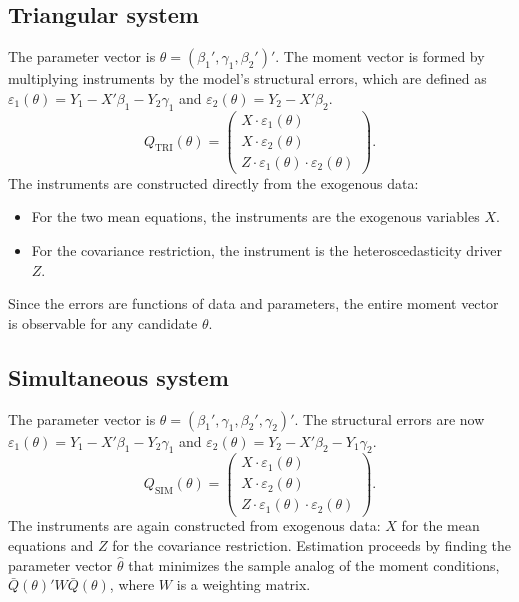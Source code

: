 \documentclass{article}
\theoremstyle{plain}
\begin{document}
\subsection{Triangular system}
The parameter vector is $\theta = (\beta_1', \gamma_1, \beta_2')'$. The moment vector is formed by multiplying instruments by the model's structural errors, which are defined as \(\varepsilon_1(\theta) = Y_1 - X'\beta_1 - Y_2\gamma_1\) and \(\varepsilon_2(\theta) = Y_2 - X'\beta_2\).
\begin{equation}\label{eq:moment_tri}
Q_{\text{TRI}}(\theta) =
  \begin{pmatrix}
    X \cdot \varepsilon_1(\theta) \\[3pt]
    X \cdot \varepsilon_2(\theta) \\[3pt]
    Z \cdot \varepsilon_1(\theta) \cdot \varepsilon_2(\theta)
  \end{pmatrix}.
\end{equation}
The instruments are constructed directly from the exogenous data:
\begin{itemize}\itemsep0pt
    \item For the two mean equations, the instruments are the exogenous variables \(X\).
    \item For the covariance restriction, the instrument is the heteroscedasticity driver \(Z\).
\end{itemize}
Since the errors are functions of data and parameters, the entire moment vector is observable for any candidate \(\theta\).

\subsection{Simultaneous system}
The parameter vector is $\theta = (\beta_1', \gamma_1, \beta_2', \gamma_2)'$. The structural errors are now \(\varepsilon_1(\theta) = Y_1 - X'\beta_1 - Y_2\gamma_1\) and \(\varepsilon_2(\theta) = Y_2 - X'\beta_2 - Y_1\gamma_2\).
\begin{equation}\label{eq:moment_sim}
Q_{\text{SIM}}(\theta) =
  \begin{pmatrix}
    X \cdot \varepsilon_1(\theta) \\[3pt]
    X \cdot \varepsilon_2(\theta) \\[3pt]
    Z \cdot \varepsilon_1(\theta) \cdot \varepsilon_2(\theta)
  \end{pmatrix}.
\end{equation}
The instruments are again constructed from exogenous data: \(X\) for the mean equations and \(Z\) for the covariance restriction. Estimation proceeds by finding the parameter vector \(\hat\theta\) that minimizes the sample analog of the moment conditions, \(\bar{Q}(\theta)'W\bar{Q}(\theta)\), where \(W\) is a weighting matrix.
\end{document}
